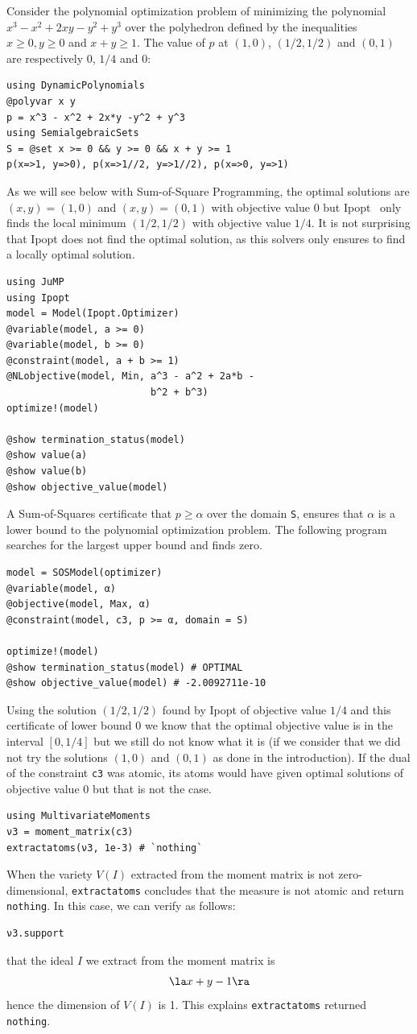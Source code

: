 \documentclass[11pt,twoside,a4paper,openright]{uclouvain-thesis}
\begin{document}
\begin{myexem}
  \label{exem:atom}
Consider the polynomial optimization problem of
minimizing the polynomial $x^3 - x^2 + 2xy -y^2 + y^3$
over the polyhedron defined by the inequalities $x \ge 0, y \ge 0$ and $x + y \geq 1$.
The value of $p$ at $(1, 0)$, $(1/2, 1/2)$ and $(0, 1)$ are respectively $0$, $1/4$ and $0$:
\begin{verbatim}
using DynamicPolynomials
@polyvar x y
p = x^3 - x^2 + 2x*y -y^2 + y^3
using SemialgebraicSets
S = @set x >= 0 && y >= 0 && x + y >= 1
p(x=>1, y=>0), p(x=>1//2, y=>1//2), p(x=>0, y=>1)
\end{verbatim}
As we will see below with Sum-of-Square Programming,
the optimal solutions are $(x, y) = (1, 0)$ and $(x, y) = (0, 1)$ with objective value $0$ but
Ipopt~\cite{biegler2009large} only finds the local minimum $(1/2, 1/2)$ with objective value $1/4$.
It is not surprising that Ipopt does not find the optimal solution,
as this solvers only ensures to find a locally optimal solution.
\begin{verbatim}
using JuMP
using Ipopt
model = Model(Ipopt.Optimizer)
@variable(model, a >= 0)
@variable(model, b >= 0)
@constraint(model, a + b >= 1)
@NLobjective(model, Min, a^3 - a^2 + 2a*b -
                         b^2 + b^3)
optimize!(model)

@show termination_status(model)
@show value(a)
@show value(b)
@show objective_value(model)
\end{verbatim}
A Sum-of-Squares certificate that $p \ge \alpha$ over the domain \texttt{S}, ensures that $\alpha$ is a lower bound to the polynomial optimization problem.
The following program searches for the largest upper bound and finds zero.
\begin{verbatim}
model = SOSModel(optimizer)
@variable(model, α)
@objective(model, Max, α)
@constraint(model, c3, p >= α, domain = S)

optimize!(model)
@show termination_status(model) # OPTIMAL
@show objective_value(model) # -2.0092711e-10
\end{verbatim}
Using the solution $(1/2, 1/2)$ found by Ipopt of objective value $1/4$
and this certificate of lower bound $0$ we know that the optimal objective value is in the interval $[0, 1/4]$
but we still do not know what it is (if we consider that we did not try the solutions $(1, 0)$ and $(0, 1)$ as done in the introduction).
If the dual of the constraint \texttt{c3} was atomic, its atoms would have given optimal solutions of objective value $0$ but that is not the case.
\begin{verbatim}
using MultivariateMoments
ν3 = moment_matrix(c3)
extractatoms(ν3, 1e-3) # `nothing`
\end{verbatim}
When the variety $V(I)$ extracted from the moment matrix is not zero-dimensional,
\texttt{extractatoms} concludes that the measure is not atomic and return \texttt{nothing}.
In this case, we can verify as follows:
\begin{verbatim}
ν3.support
\end{verbatim}
that the ideal $I$ we extract from the moment matrix is
$$\la x + y - 1 \ra$$
hence the dimension of $V(I)$ is 1.
This explains \texttt{extractatoms} returned \texttt{nothing}.


\end{myexem}
\end{document}
